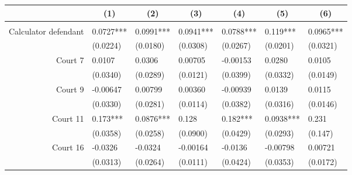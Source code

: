 \begin{tabular}{rrrrrrr}
\toprule
\multicolumn{1}{c}{} & \multicolumn{1}{c}{(1)} & \multicolumn{1}{c}{(2)} & \multicolumn{1}{c}{(3)} & \multicolumn{1}{c}{(4)} & \multicolumn{1}{c}{(5)} & \multicolumn{1}{c}{(6)} \\
\midrule
      &       &       &       &       &       &  \\
Calculator defendant & \multicolumn{1}{l}{0.0727***} & \multicolumn{1}{l}{0.0991***} & \multicolumn{1}{l}{0.0941***} & \multicolumn{1}{l}{0.0788***} & \multicolumn{1}{l}{0.119***} & \multicolumn{1}{l}{0.0965***} \\
      & \multicolumn{1}{l}{(0.0224)} & \multicolumn{1}{l}{(0.0180)} & \multicolumn{1}{l}{(0.0308)} & \multicolumn{1}{l}{(0.0267)} & \multicolumn{1}{l}{(0.0201)} & \multicolumn{1}{l}{(0.0321)} \\
Court 7 & \multicolumn{1}{l}{0.0107} & \multicolumn{1}{l}{0.0306} & \multicolumn{1}{l}{0.00705} & \multicolumn{1}{l}{-0.00153} & \multicolumn{1}{l}{0.0280} & \multicolumn{1}{l}{0.0105} \\
      & \multicolumn{1}{l}{(0.0340)} & \multicolumn{1}{l}{(0.0289)} & \multicolumn{1}{l}{(0.0121)} & \multicolumn{1}{l}{(0.0399)} & \multicolumn{1}{l}{(0.0332)} & \multicolumn{1}{l}{(0.0149)} \\
Court 9 & \multicolumn{1}{l}{-0.00647} & \multicolumn{1}{l}{0.00799} & \multicolumn{1}{l}{0.00360} & \multicolumn{1}{l}{-0.00939} & \multicolumn{1}{l}{0.0139} & \multicolumn{1}{l}{0.0115} \\
      & \multicolumn{1}{l}{(0.0330)} & \multicolumn{1}{l}{(0.0281)} & \multicolumn{1}{l}{(0.0114)} & \multicolumn{1}{l}{(0.0382)} & \multicolumn{1}{l}{(0.0316)} & \multicolumn{1}{l}{(0.0146)} \\
Court 11 & \multicolumn{1}{l}{0.173***} & \multicolumn{1}{l}{0.0876***} & \multicolumn{1}{l}{0.128} & \multicolumn{1}{l}{0.182***} & \multicolumn{1}{l}{0.0938***} & \multicolumn{1}{l}{0.231} \\
      & \multicolumn{1}{l}{(0.0358)} & \multicolumn{1}{l}{(0.0258)} & \multicolumn{1}{l}{(0.0900)} & \multicolumn{1}{l}{(0.0429)} & \multicolumn{1}{l}{(0.0293)} & \multicolumn{1}{l}{(0.147)} \\
Court 16 & \multicolumn{1}{l}{-0.0326} & \multicolumn{1}{l}{-0.0324} & \multicolumn{1}{l}{-0.00164} & \multicolumn{1}{l}{-0.0136} & \multicolumn{1}{l}{-0.00798} & \multicolumn{1}{l}{0.00721} \\
      & \multicolumn{1}{l}{(0.0313)} & \multicolumn{1}{l}{(0.0264)} & \multicolumn{1}{l}{(0.0111)} & \multicolumn{1}{l}{(0.0424)} & \multicolumn{1}{l}{(0.0353)} & \multicolumn{1}{l}{(0.0172)} \\

\end{tabular}

